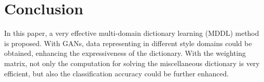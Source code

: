 \documentclass{article}
\begin{document}
\section{Conclusion}

In this paper, a very effective multi-domain dictionary learning (MDDL) method is proposed. With GANs, data representing in different style domains could be obtained, enhancing the expressiveness of the dictionary. With the weighting matrix, not only the computation for solving the miscellaneous dictionary is very efficient, but also the classification accuracy could be further enhanced. 



\end{document}
